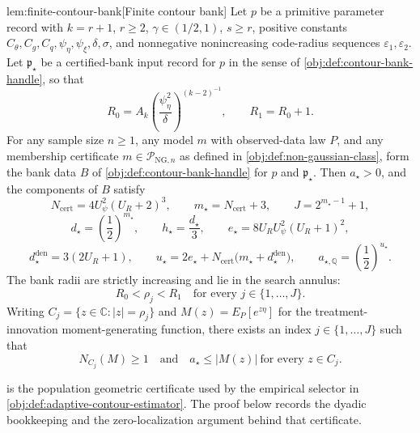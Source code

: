 \begin{lemmav}{lem:finite-contour-bank}[Finite contour bank]
Let \(p\) be a primitive parameter record with \(k=r+1\), \(r\ge2\), \(\gamma\in(1/2,1)\), \(s\ge r\), positive constants \(C_{\theta},C_g,C_q,\psi_{\eta},\psi_{\xi},\delta,\sigma\), and nonnegative nonincreasing code-radius sequences \(\varepsilon_1,\varepsilon_2\). Let \(\mathfrak p_{\star}\) be a certified-bank input record for \(p\) in the sense of \cref{obj:def:contour-bank-handle}, so that
\[
R_0=A_k\left(\frac{\psi_{\eta}^2}{\delta}\right)^{(k-2)^{-1}},
\qquad
R_1=R_0+1 .
\]
For any sample size \(n\ge1\), any model \(m\) with observed-data law \(P\), and any membership certificate \(m\in\mathcal P_{\mathrm{NG},n}\) as defined in \cref{obj:def:non-gaussian-class}, form the bank data \(B\) of \cref{obj:def:contour-bank-handle} for \(p\) and \(\mathfrak p_{\star}\). Then \(a_{\star}>0\), and the components of \(B\) satisfy
\[
N_{\mathrm{cert}}=4U_{\psi}^{2}(U_R+2)^3,\qquad
m_{\star}=N_{\mathrm{cert}}+3,\qquad
J=2^{m_{\star}-1}+1,
\]
\[
d_{\star}=\left(\frac12\right)^{m_{\star}},\qquad
h_{\star}=\frac{d_{\star}}{3},\qquad
e_{\star}=8U_RU_{\psi}^{2}(U_R+1)^2,
\]
\[
d_{\star}^{\mathrm{den}}=3(2U_R+1),\qquad
u_{\star}=2e_{\star}+N_{\mathrm{cert}}\bigl(m_{\star}+d_{\star}^{\mathrm{den}}\bigr),\qquad
a_{\star,\mathbb Q}=\left(\frac12\right)^{u_{\star}}.
\]
The bank radii are strictly increasing and lie in the search annulus:
\[
R_0<\rho_j<R_1
\quad\text{for every }j\in\{1,\ldots,J\}.
\]
Writing \(C_j=\{z\in\mathbb C:|z|=\rho_j\}\) and \(M(z)=E_P[e^{z\eta}]\) for the treatment-innovation moment-generating function, there exists an index \(j\in\{1,\ldots,J\}\) such that
\[
N_{C_j}(M)\ge1
\quad\text{and}\quad
a_{\star}\le |M(z)|\ \text{for every }z\in C_j .
\]
\end{lemmav}

 is the population geometric certificate used by the empirical selector in \cref{obj:def:adaptive-contour-estimator}. The proof below records the dyadic bookkeeping and the zero-localization argument behind that certificate.
